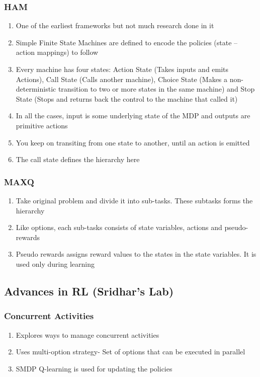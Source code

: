 \subsubsection{HAM}
\begin{enumerate}
\item[] One of the earliest frameworks but not much research done in it 
\item[] Simple Finite State Machines are defined to encode the policies (state – action mappings) to follow 
\item[] Every machine has four states: Action State (Takes inputs and emits Actions), Call State (Calls another machine), Choice State (Makes a non-deterministic transition to two or more states in the same machine) and Stop State (Stops and returns back the control to the machine that called it)
\item[] In all the cases, input is some underlying state of the MDP and outputs are primitive actions 
\item[] You keep on transiting from one state to another, until an action is emitted 
\item[]	The call state defines the hierarchy here 
\end{enumerate}


\subsubsection{MAXQ}
\begin{enumerate}
\item[] Take original problem and divide it into sub-tasks. These subtasks forms the hierarchy
\item[] Like options, each sub-tasks consists of state variables, actions and pseudo-rewards
\item[] Pseudo rewards assigns reward values to the states in the state variables. It is used only during learning 
\end{enumerate}




\subsection{Advances in RL (Sridhar's Lab)}
\subsubsection{Concurrent Activities}
\begin{enumerate}
\item[] Explores ways to manage concurrent activities
\item[] Uses multi-option strategy- Set of options that can be executed in parallel
\item[] SMDP Q-learning is used for updating the policies
\end{enumerate}


